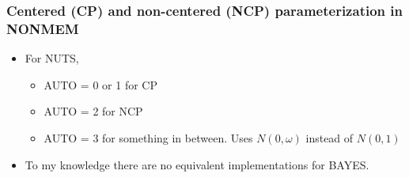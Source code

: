 \documentclass{beamer}
\begin{document}
\begin{frame}
  \frametitle{Centered (CP) and non-centered (NCP) parameterization in NONMEM}
  
  \begin{itemize}
  \item For NUTS, 
    \begin{itemize}
    \item AUTO = 0 or 1 for CP
      \item AUTO = 2 for NCP
 \item AUTO = 3 for something in between. Uses $N(0, \omega)$ instead
   of $N(0, 1)$
    \end{itemize}
\item To my knowledge there are no equivalent implementations for BAYES.
  \end{itemize}

\end{frame}
\end{document}
